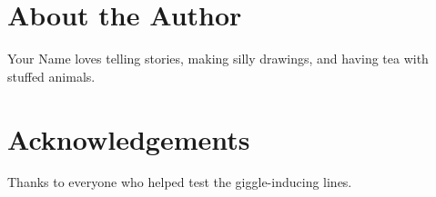 \documentclass[12pt,openany]{book}
\newcommand{\bigpara}{\fontsize{18}{24}\selectfont}
\begin{document}
\clearpage

\backmatter
\chapter*{About the Author}
\bigpara
Your Name loves telling stories, making silly drawings, and having tea with stuffed animals.

\clearpage

\chapter*{Acknowledgements}
\bigpara
Thanks to everyone who helped test the giggle-inducing lines.
\end{document}

